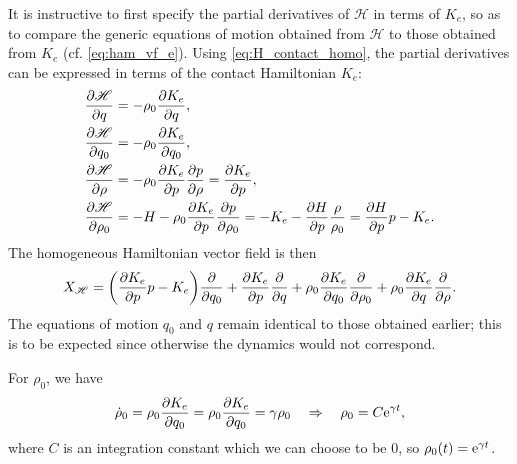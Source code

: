 It is instructive to first specify the partial derivatives of \(\mathscr{H}\) in terms of \(K_e\), so as to compare the generic equations of motion obtained from \(\mathscr{H}\) to those obtained from \(K_e\) (cf. \cref{eq:ham_vf_e}). Using \cref{eq:H_contact_homo}, the partial derivatives can be expressed in terms of the contact Hamiltonian \(K_e\):
\begin{equation}
    \begin{split}
        \pdv{\mathscr{H}}{q} &= -\rho_0 \pdv{K_e}{q}, \\
        \pdv{\mathscr{H}}{q_0} &= -\rho_0 \pdv{K_e}{q_0}, \\
        \pdv{\mathscr{H}}{\rho} &= -\rho_0 \pdv{K_e}{p}\pdv{p}{\rho} = \pdv{K_e}{p}, \\
        \pdv{\mathscr{H}}{\rho_0} &= -H - \rho_0 \pdv{K_e}{p}\pdv{p}{\rho_0} = -K_e - \pdv{H}{p}\frac{\rho}{\rho_0} = \pdv{H}{p}p - K_e.\\
    \end{split}
\end{equation}
The homogeneous Hamiltonian vector field is then
\begin{equation}
    X_\mathscr{H} = \qty(\pdv{K_e}{p}p - K_e)\pdv{}{q_0}
                    + \pdv{K_e}{p}\pdv{}{q}
                    + \rho_0\pdv{K_e}{q_0}\pdv{}{\rho_0}
                    + \rho_0\pdv{K_e}{q}\pdv{}{\rho}.
    \label{eq:hom_ham_vf}
\end{equation}
The equations of motion \(q_0\) and \(q\) remain identical to those obtained earlier; this is to be expected since otherwise the dynamics would not correspond. 

For \(\rho_0\), we have
\begin{equation}
     \dot{\rho}_0 = \rho_0 \pdv{K_e}{q_0} = \rho_0 \pdv{K_e}{q_0}  = \gamma\rho_0 \quad \Rightarrow \quad \rho_0 = C\mathrm{e}^{\gamma t},
\end{equation} 
where \(C\) is an integration constant which we can choose to be 0, so \(\rho_0(t) = \mathrm{e}^{\gamma t}\).

